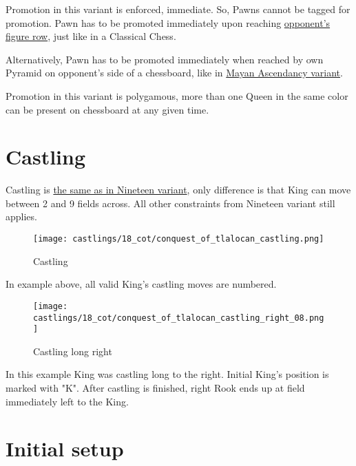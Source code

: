 Promotion in this variant is enforced, immediate. So, Pawns cannot be tagged
for promotion. Pawn has to be promoted immediately upon reaching
\hyperref[sec:Terms/Figure row]{opponent's figure row},
just like in a Classical Chess.

Alternatively, Pawn has to be promoted immediately when reached by own Pyramid
on opponent's side of a chessboard, like in
\hyperref[sec:Mayan Ascendancy/Pyramid/Promotion]{Mayan Ascendancy variant}.

Promotion in this variant is polygamous, more than one Queen in the same color
can be present on chessboard at any given time.

\clearpage %

\section*{Castling}
\label{sec:Conquest of Tlalocan/Castling}

Castling is
\hyperref[sec:Nineteen/Castling]{the same as in Nineteen variant},
only difference is that King can move
between 2 and 9 fields across. All other constraints from Nineteen variant still
applies.

\noindent
\begin{figure}[!h]
\texttt{[image: castlings/18\_cot/conquest\_of\_tlalocan\_castling.png]}
\caption{Castling}
\label{fig:conquest_of_tlalocan_castling}
\end{figure}

In example above, all valid King's castling moves are numbered.

\noindent
\begin{figure}[!h]
\texttt{[image: castlings/18\_cot/conquest\_of\_tlalocan\_castling\_right\_08.png]}
\caption{Castling long right}
\label{fig:conquest_of_tlalocan_castling_right_08}
\end{figure}

In this example King was castling long to the right. Initial King's position
is marked with "K". After castling is finished, right Rook ends up at field
immediately left to the King.

\clearpage %

\section*{Initial setup}
\label{sec:Conquest of Tlalocan/Initial setup}

